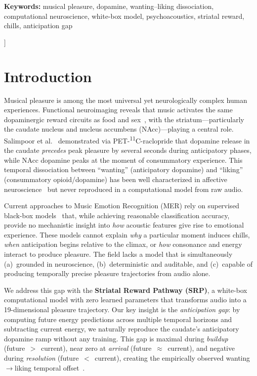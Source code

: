 \documentclass[10pt,twocolumn]{article}
\begin{document}
\par\vspace{6pt}
{\small\textbf{Keywords:} musical pleasure, dopamine, wanting--liking dissociation, computational neuroscience, white-box model, psychoacoustics, striatal reward, chills, anticipation gap\par}
\vspace{16pt}
]

\section{Introduction}
\label{sec:introduction}

Musical pleasure is among the most universal yet neurologically complex human experiences. Functional neuroimaging reveals that music activates the same dopaminergic reward circuits as food and sex~\cite{Blood2001,Salimpoor2011}, with the striatum---particularly the caudate nucleus and nucleus accumbens (NAcc)---playing a central role. Salimpoor et al.~\cite{Salimpoor2011} demonstrated via PET-\textsuperscript{11}C-raclopride that dopamine release in the caudate \textit{precedes} peak pleasure by several seconds during anticipatory phases, while NAcc dopamine peaks at the moment of consummatory experience. This temporal dissociation between ``wanting'' (anticipatory dopamine) and ``liking'' (consummatory opioid/dopamine) has been well characterized in affective neuroscience~\cite{Berridge2003} but never reproduced in a computational model from raw audio.

Current approaches to Music Emotion Recognition (MER) rely on supervised black-box models~\cite{Eerola2011,Yang2018} that, while achieving reasonable classification accuracy, provide no mechanistic insight into \textit{how} acoustic features give rise to emotional experience. These models cannot explain \textit{why} a particular moment induces chills, \textit{when} anticipation begins relative to the climax, or \textit{how} consonance and energy interact to produce pleasure. The field lacks a model that is simultaneously (a)~grounded in neuroscience, (b)~deterministic and auditable, and (c)~capable of producing temporally precise pleasure trajectories from audio alone.

We address this gap with the \textbf{Striatal Reward Pathway (SRP)}, a white-box computational model with zero learned parameters that transforms audio into a 19-dimensional pleasure trajectory. Our key insight is the \textit{anticipation gap}: by computing future energy predictions across multiple temporal horizons and subtracting current energy, we naturally reproduce the caudate's anticipatory dopamine ramp without any training. This gap is maximal during \textit{buildup} (future~$>$~current), near zero at \textit{arrival} (future~$\approx$~current), and negative during \textit{resolution} (future~$<$~current), creating the empirically observed wanting$\to$liking temporal offset~\cite{Howe2013,Salimpoor2011}.
\end{document}
